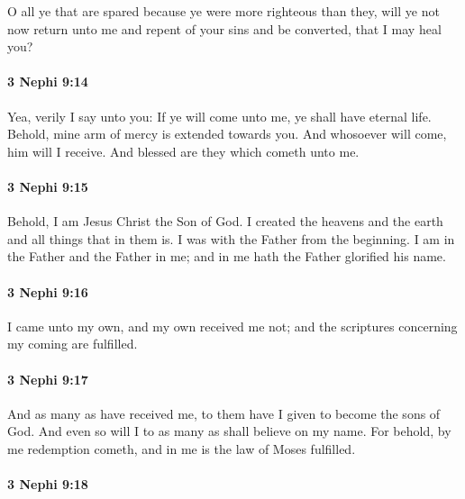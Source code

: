 			O all ye that are spared because ye were more righteous than they,
			will ye not now return unto me and repent of your sins and be converted,
			that I may heal you?

		\paragraph{3 Nephi 9:14} %
			\label{3NEPHI-9-14}

			Yea, verily I say unto you:
			If ye will come unto me, ye shall have eternal life.
			Behold, mine arm of mercy is extended towards you.
			And whosoever will come, him will I receive.
			And blessed are they which cometh unto me.

		\paragraph{3 Nephi 9:15} %
			\label{3NEPHI-9-15}

			Behold, I am Jesus Christ the Son of God.
			I created the heavens and the earth and all things that in them is.
			I was with the Father from the beginning.
			I am in the Father and the Father in me;
			and in me hath the Father glorified his name.

		\paragraph{3 Nephi 9:16} %
			\label{3NEPHI-9-16}

			I came unto my own, and my own received me not;
			and the scriptures concerning my coming are fulfilled.

		\paragraph{3 Nephi 9:17} %
			\label{3NEPHI-9-17}

			And as many as have received me,
			to them have I given to become the sons of God.
			And even so will I to as many as shall believe on my name.
			For behold, by me redemption cometh,
			and in me is the law of Moses fulfilled.

		\paragraph{3 Nephi 9:18} %
			\label{3NEPHI-9-18}

